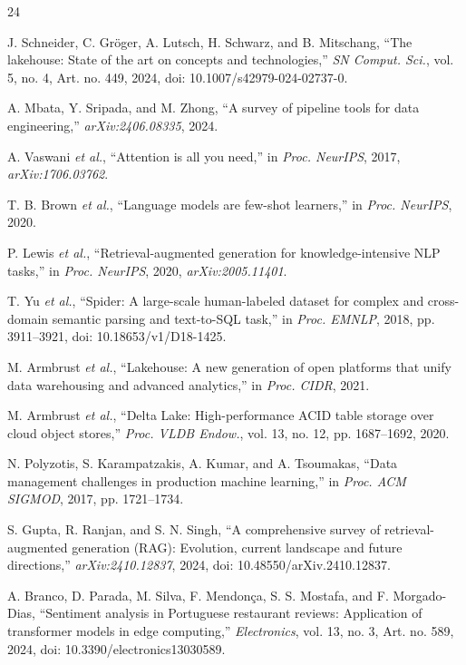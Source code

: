 \documentclass[12pt,a4paper]{report}
\begin{document}
\clearpage
{}
\begin{thebibliography}{24}
\small

 J. Schneider, C. Gr\"oger, A. Lutsch, H. Schwarz, and B. Mitschang, ``The lakehouse: State of the art on concepts and technologies,'' \emph{SN Comput. Sci.}, vol. 5, no. 4, Art. no. 449, 2024, doi: 10.1007/s42979-024-02737-0.

 A. Mbata, Y. Sripada, and M. Zhong, ``A survey of pipeline tools for data engineering,'' \emph{arXiv:2406.08335}, 2024.

 A. Vaswani \emph{et al.}, ``Attention is all you need,'' in \emph{Proc. NeurIPS}, 2017, \emph{arXiv:1706.03762}.

 T. B. Brown \emph{et al.}, ``Language models are few-shot learners,'' in \emph{Proc. NeurIPS}, 2020.

 P. Lewis \emph{et al.}, ``Retrieval-augmented generation for knowledge-intensive NLP tasks,'' in \emph{Proc. NeurIPS}, 2020, \emph{arXiv:2005.11401}.

 T. Yu \emph{et al.}, ``Spider: A large-scale human-labeled dataset for complex and cross-domain semantic parsing and text-to-SQL task,'' in \emph{Proc. EMNLP}, 2018, pp. 3911--3921, doi: 10.18653/v1/D18-1425.

 M. Armbrust \emph{et al.}, ``Lakehouse: A new generation of open platforms that unify data warehousing and advanced analytics,'' in \emph{Proc. CIDR}, 2021.

 M. Armbrust \emph{et al.}, ``Delta Lake: High-performance ACID table storage over cloud object stores,'' \emph{Proc. VLDB Endow.}, vol. 13, no. 12, pp. 1687--1692, 2020.

 N. Polyzotis, S. Karampatzakis, A. Kumar, and A. Tsoumakas, ``Data management challenges in production machine learning,'' in \emph{Proc. ACM SIGMOD}, 2017, pp. 1721--1734.

 S. Gupta, R. Ranjan, and S. N. Singh, ``A comprehensive survey of retrieval-augmented generation (RAG): Evolution, current landscape and future directions,'' \emph{arXiv:2410.12837}, 2024, doi: 10.48550/arXiv.2410.12837.

 A. Branco, D. Parada, M. Silva, F. Mendon\c{c}a, S. S. Mostafa, and F. Morgado-Dias, ``Sentiment analysis in Portuguese restaurant reviews: Application of transformer models in edge computing,'' \emph{Electronics}, vol. 13, no. 3, Art. no. 589, 2024, doi: 10.3390/electronics13030589.


\end{thebibliography}
\end{document}
